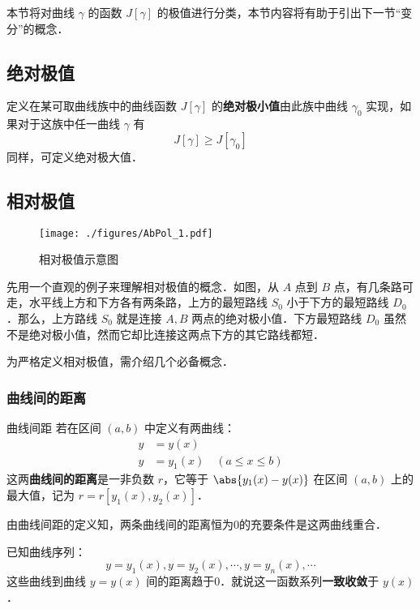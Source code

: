

本节将对曲线 $\gamma$ 的函数 $J[\gamma]$ 的极值进行分类，本节内容将有助于引出下一节“变分”的概念．

\subsection{绝对极值}
定义在某可取曲线族中的曲线函数 $J[\gamma]$ 的\textbf{绝对极小值}由此族中曲线 $\gamma_0$ 实现，如果对于这族中任一曲线 $\gamma$ 有
\begin{equation}
J[\gamma]\geq J[\gamma_0]
\end{equation}
同样，可定义绝对极大值．
\subsection{相对极值}
\begin{figure}[ht]
\centering
\texttt{[image: ./figures/AbPol\_1.pdf]}
\caption{相对极值示意图} \label{AbPol_fig1}
\end{figure}

先用一个直观的例子来理解相对极值的概念．如图，从 $A$ 点到 $B$ 点，有几条路可走，水平线上方和下方各有两条路，上方的最短路线 $S_0$ 小于下方的最短路线 $D_0$ ．那么，上方路线 $S_0$ 就是连接 $A,B$ 两点的绝对极小值．下方最短路线 $D_0$ 虽然不是绝对极小值，然而它却比连接这两点下方的其它路线都短． 

为严格定义相对极值，需介绍几个必备概念．
\subsubsection{曲线间的距离}
\begin{definition}{曲线间距}
若在区间 $(a,b)$ 中定义有两曲线：
\begin{equation}
\begin{aligned}
y&=y(x)\\
y&=y_1(x)\quad(a\leq x\leq b)
\end{aligned}
\end{equation}
这两\textbf{曲线间的距离}是一非负数 $r$，它等于 $\abs{y_1(x)-y(x)}$ 在区间 $(a,b)$ 上的最大值，记为 $r=r[y_1(x),y_2(x)]$．
\end{definition}
由曲线间距的定义知，两条曲线间的距离恒为0的充要条件是这两曲线重合．

已知曲线序列：
\begin{equation}
y=y_1(x),y=y_2(x),\cdots,y=y_n(x),\cdots
\end{equation}
这些曲线到曲线 $y=y(x)$ 间的距离趋于0．就说这一函数系列\textbf{一致收敛}于 $y(x)$．

